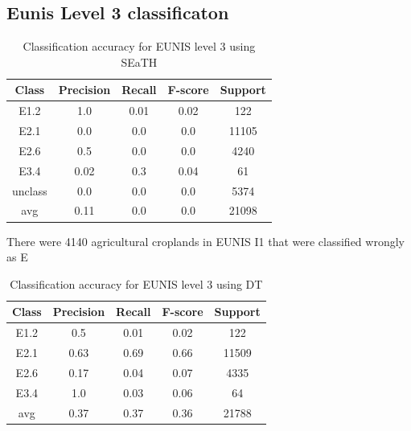 \documentclass[authoryear, review,12pt,number]{elsarticle}
\begin{document}
\subsection{Eunis Level 3 classificaton}
\begin{table}
\centering
\begin{tabular}{c c c c c}
Class & Precision & Recall & F-score & Support\\
\hline
E1.2 & 1.0 & 0.01 & 0.02 & 122\\
E2.1 & 0.0 & 0.0 & 0.0 & 11105\\
E2.6 & 0.5 & 0.0 & 0.0 & 4240\\
E3.4 & 0.02 & 0.3 & 0.04 & 61\\
unclass & 0.0 & 0.0 & 0.0 & 5374\\
avg & 0.11 & 0.0 & 0.0 & 21098\\
\end{tabular}
\caption{Classification accuracy for EUNIS level 3 using SEaTH}
\end{table}
There were 4140 agricultural croplands in EUNIS I1 that were classified wrongly 
as E 
\begin{table}
\centering
\begin{tabular}{c c c c c}
Class & Precision & Recall & F-score & Support\\
\hline
E1.2 & 0.5 & 0.01 & 0.02 & 122\\
E2.1 & 0.63 & 0.69 & 0.66 & 11509\\
E2.6 & 0.17 & 0.04 & 0.07 & 4335\\
E3.4 & 1.0 & 0.03 & 0.06 & 64\\
avg & 0.37 & 0.37 & 0.36 & 21788\\
\end{tabular}
\caption{Classification accuracy for EUNIS level 3 using DT}
\end{table}

% 
% 
\end{document}
